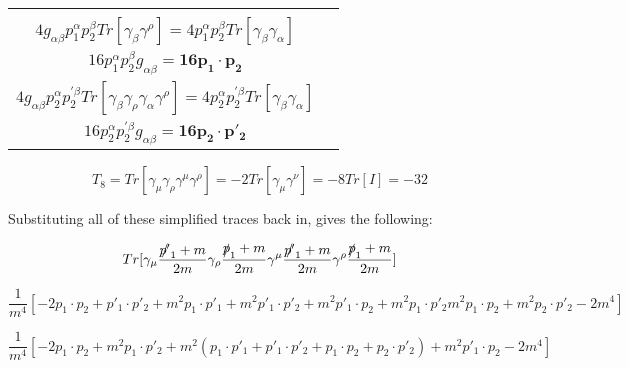 \documentclass[a4]{article}
\begin{document}
\begin{center}
\begin{tabular}{| c | c |}
            \shortstack{$T_6 = Tr [\gamma_\mu \slashed{p}_1 \gamma_\rho \gamma^\mu \slashed{p}_2 \gamma^\rho] = p_1^{\alpha} p_2^{\beta} Tr [\gamma_\mu \gamma_\alpha \gamma_\rho \gamma^\mu \gamma_\beta \gamma^\rho]$ \\ $ 4 g_{\alpha \beta} p_1^{\alpha} p_2^{\beta} Tr [\gamma_\beta \gamma^\rho] = 4 p_1^{\alpha} p_2^{\beta} Tr [\gamma_\beta \gamma_\alpha]$ \\ $16 p_1^{\alpha} p_2^{\beta} g_{\alpha \beta} = \mathbf{16 p_1 \cdot p_2}$} & \shortstack{$T_7 = Tr [\gamma_\mu \gamma_\rho \gamma^\mu \slashed{p}_2 \gamma^\rho \slashed{p'}_2] = p_2^{\alpha} p_2^{'\beta} Tr [\gamma_\mu \gamma_\rho \gamma^\mu \gamma_\alpha \gamma^\rho \gamma_\beta]$ \\ $ 4 g_{\alpha \beta} p_2^{\alpha} p_2^{'\beta} Tr [\gamma_\beta \gamma_\rho \gamma_\alpha \gamma^\rho] = 4 p_2^{\alpha} p_2^{'\beta} Tr [\gamma_\beta \gamma_\alpha]$ \\ $16 p_2^{\alpha} p_2^{'\beta} g_{\alpha \beta} = \mathbf{16 p_2 \cdot p'_2}$} \\
            \hline
        \end{tabular}
    \end{center}

    \begin{equation}
        T_8 = Tr [\gamma_\mu \gamma_\rho \gamma^\mu \gamma^\rho] = - 2 Tr [\gamma_\mu \gamma^\nu] = - 8 Tr [I] = -32
    \end{equation}

    Substituting all of these simplified traces back in, gives the following:

    \begin{equation}
        Tr [\gamma_\mu \frac{\slashed{p'}_1 + m}{2m} \gamma_\rho \frac{\slashed{p}_1 + m}{2 m} \gamma^\mu \frac{\slashed{p'}_1 + m}{2m} \gamma^\rho \frac{\slashed{p}_1 + m}{2 m}]
    \end{equation}

    \begin{equation}
        \frac{1}{m^4} [-2 p_1 \cdot p_2 + p'_1 \cdot p'_2 + m^2 p_1 \cdot p'_1 + m^2 p'_1 \cdot p'_2 + m^2 p'_1 \cdot p_2 + m^2 p_1 \cdot p'_2 m^2 p_1 \cdot p_2 + m^2 p_2 \cdot p'_2 - 2 m^4]
    \end{equation}

    \begin{equation}
        \frac{1}{m^4} [-2 p_1 \cdot p_2 + m^2 p_1 \cdot p'_2 + m^2 (p_1 \cdot p'_1 + p'_1 \cdot p'_2 + p_1 \cdot p_2 + p_2 \cdot p'_2) + m^2 p'_1 \cdot p_2 - 2 m^4]
    \end{equation}
\end{document}

